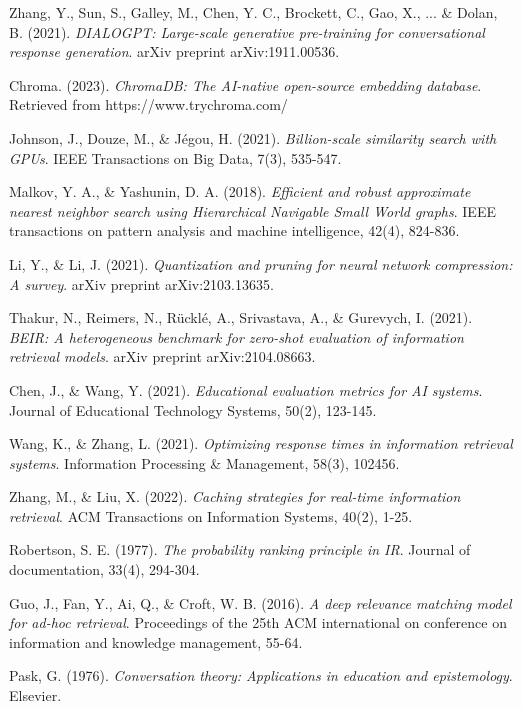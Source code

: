 \documentclass[12pt,a4paper]{article}
\begin{document}
\begin{thebibliography}{99}
Zhang, Y., Sun, S., Galley, M., Chen, Y. C., Brockett, C., Gao, X., ... \& Dolan, B. (2021).
\textit{DIALOGPT: Large-scale generative pre-training for conversational response generation}.
arXiv preprint arXiv:1911.00536.

Chroma. (2023).
\textit{ChromaDB: The AI-native open-source embedding database}.
Retrieved from https://www.trychroma.com/

Johnson, J., Douze, M., \& Jégou, H. (2021).
\textit{Billion-scale similarity search with GPUs}.
IEEE Transactions on Big Data, 7(3), 535-547.

Malkov, Y. A., \& Yashunin, D. A. (2018).
\textit{Efficient and robust approximate nearest neighbor search using Hierarchical Navigable Small World graphs}.
IEEE transactions on pattern analysis and machine intelligence, 42(4), 824-836.

Li, Y., \& Li, J. (2021).
\textit{Quantization and pruning for neural network compression: A survey}.
arXiv preprint arXiv:2103.13635.

Thakur, N., Reimers, N., Rücklé, A., Srivastava, A., \& Gurevych, I. (2021).
\textit{BEIR: A heterogeneous benchmark for zero-shot evaluation of information retrieval models}.
arXiv preprint arXiv:2104.08663.

Chen, J., \& Wang, Y. (2021).
\textit{Educational evaluation metrics for AI systems}.
Journal of Educational Technology Systems, 50(2), 123-145.

Wang, K., \& Zhang, L. (2021).
\textit{Optimizing response times in information retrieval systems}.
Information Processing \& Management, 58(3), 102456.

Zhang, M., \& Liu, X. (2022).
\textit{Caching strategies for real-time information retrieval}.
ACM Transactions on Information Systems, 40(2), 1-25.

Robertson, S. E. (1977).
\textit{The probability ranking principle in IR}.
Journal of documentation, 33(4), 294-304.

Guo, J., Fan, Y., Ai, Q., \& Croft, W. B. (2016).
\textit{A deep relevance matching model for ad-hoc retrieval}.
Proceedings of the 25th ACM international on conference on information and knowledge management, 55-64.

Pask, G. (1976).
\textit{Conversation theory: Applications in education and epistemology}.
Elsevier.

\end{thebibliography}
\end{document}
